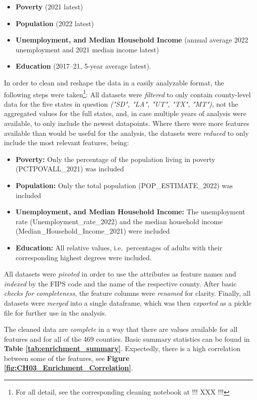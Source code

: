 \begin{itemize}
    \item \textbf{Poverty} (2021 latest)
    \item \textbf{Population} (2022 latest)
    \item \textbf{Unemployment, and Median Household Income} (annual average 2022 unemployment and 2021 median income latest)
    \item \textbf{Education} (2017–21, 5-year average latest).
\end{itemize}

In order to clean and reshape the data in a easily analyzable format, the following steps were taken\footnote{For all detail, see the corresponding cleaning notebook at !!! XXX !!!}:
All datasets were \textit{filtered} to only contain county-level data for the five states in question \textit{("SD", "LA", "UT", "TX", "MT")}, not the aggregated values for the full states, and, in case multiple years of analysis were available, to only include the newest datapoints. 
Where there were more features available than would be useful for the analysis, the datasets were \textit{reduced} to only include the most relevant features, being:

\begin{itemize}
    \item \textbf{Poverty:} Only the percentage of the population living in poverty (PCTPOVALL\_2021) was included
    \item \textbf{Population:} Only the total population (POP\_ESTIMATE\_2022) was included
    \item \textbf{Unemployment, and Median Household Income:} The unemployment rate (Unemployment\_rate\_2022) and the median household income (Median\_Household\_Income\_2021) were included
    \item \textbf{Education:} All relative values, i.e.\ percentages of adults with their corresponding highest degrees were included.
\end{itemize}

All datasets were \textit{pivoted} in order to use the attributes as feature names and \textit{indexed} by the FIPS code and the name of the respective county. 
After basic \textit{checks for completeness}, the feature columns were \textit{renamed} for clarity. Finally, all datasets were \textit{merged} into a single dataframe, which was then \textit{exported} as a pickle file for further use in the analysis.

The cleaned data are \textit{complete} in a way that there are values available for all features and for all of the 469 counties. Basic summary statistics can be found in \textbf{Table \ref{tab:enrichment_summary}}. 
Expectedly, there is a high correlation between some of the features, see \textbf{Figure \ref{fig:CH03_Enrichment_Correlation}}.

